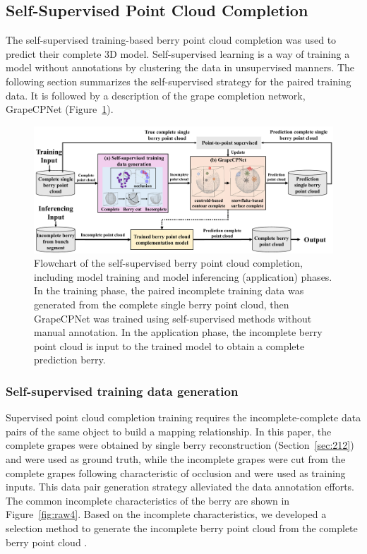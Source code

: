 \documentclass[12pt]{article}
\begin{document}
\subsection{Self-Supervised Point Cloud Completion}

The self-supervised training-based berry point cloud completion was used to predict their complete 3D model. 
Self-supervised learning is a way of training a model without annotations by clustering the data in unsupervised manners\citep{fei_selfsupervised_2023}. 
The following section summarizes the self-supervised strategy for the paired training data. It is followed by a description of the grape completion network, GrapeCPNet (Figure~\ref{fig:raw3}).

\begin{figure}[hbt!]
    \centering
    \includegraphics[width=1\textwidth]{figures/Figure7.pdf}
    \caption{Flowchart of the self-supervised berry point cloud completion, including model training and model inferencing (application) phases. In the training phase, the paired incomplete training data was generated from the complete single berry point cloud, then GrapeCPNet was trained using self-supervised methods without manual annotation. In the application phase, the incomplete berry point cloud is input to the trained model to obtain a complete prediction berry.}
    \label{fig:raw3}
\end{figure}

\subsubsection{Self-supervised training data generation}

Supervised point cloud completion training requires the incomplete-complete data pairs of the same object to build a mapping relationship. 
In this paper, the complete grapes were obtained by single berry reconstruction (Section~\ref{sec:212}) and were used as ground truth, while the incomplete grapes were cut from the complete grapes following characteristic of occlusion and were used as training inputs. 
This data pair generation strategy alleviated the data annotation efforts. The common incomplete characteristics of the berry are shown in Figure~\ref{fig:raw4}.
Based on the incomplete characteristics, we developed a selection method to generate the incomplete berry point cloud from the complete berry point cloud .
\end{document}
